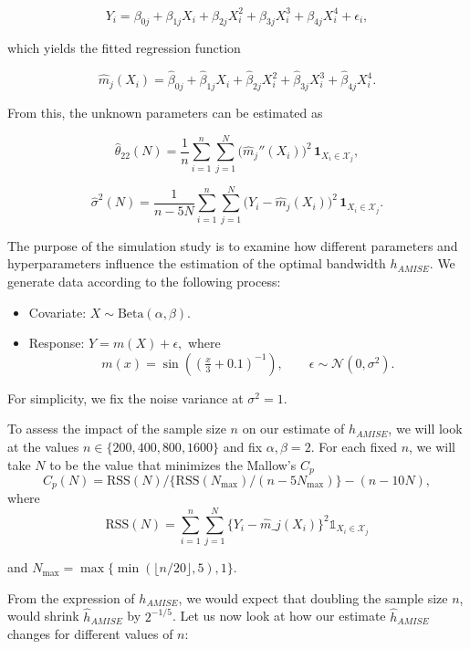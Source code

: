 \documentclass[
  letterpaper,
  DIV=11,
  numbers=noendperiod]{scrartcl}
\begin{document}
\[
Y_i = \beta_{0j} + \beta_{1j} X_i + \beta_{2j} X_i^2 + \beta_{3j} X_i^3 + \beta_{4j} X_i^4 + \epsilon_i,
\]

which yields the fitted regression function

\[
\hat{m}_j(X_i) = \hat{\beta}_{0j} + \hat{\beta}_{1j} X_i + \hat{\beta}_{2j} X_i^2 + \hat{\beta}_{3j} X_i^3 + \hat{\beta}_{4j} X_i^4.
\]

From this, the unknown parameters can be estimated as

\[
\hat{\theta}_{22}(N) = \frac{1}{n} \sum_{i=1}^n \sum_{j=1}^N \Big( \hat{m}_j''(X_i) \Big)^2 \, \mathbf{1}_{X_i \in \mathcal{X}_j},
\]

\[
\hat{\sigma}^2(N) = \frac{1}{n - 5N} \sum_{i=1}^n \sum_{j=1}^N \big( Y_i - \hat{m}_j(X_i) \big)^2 \, \mathbf{1}_{X_i \in \mathcal{X}_j}.
\]

The purpose of the simulation study is to examine how different
parameters and hyperparameters influence the estimation of the optimal
bandwidth \(h_{AMISE}\). We generate data according to the following
process:

\begin{itemize}
\item
  Covariate: \(X \sim \text{Beta}(\alpha, \beta).\)
\item
  Response: \(Y = m(X) + \epsilon,\) where \[
  m(x) = \sin\!\left( \left(\tfrac{x}{3} + 0.1\right)^{-1} \right),
  \qquad \epsilon \sim \mathcal{N}(0, \sigma^2).
  \]
\end{itemize}

For simplicity, we fix the noise variance at \(\sigma^2 = 1\).

To assess the impact of the sample size \(n\) on our estimate of
\(h_{AMISE}\), we will look at the values
\(n\in \{200, 400, 800, 1600\}\) and fix \(\alpha, \beta=2\). For each
fixed \(n\), we will take \(N\) to be the value that minimizes the
Mallow's \(C_p\)
\[ C_p(N)=\text{RSS}(N) / \lbrace \text{RSS} (N_{\max }) / (n-5 N_{\max })\rbrace -(n-10 N), \]
where
\[\text{RSS}(N) =  \sum_{i=1}^n \sum_{j=1}^N \lbrace Y_i - \hat{m}\_j(X_i) \rbrace^2 \mathbb{1}_{X_i \in \mathcal{X}_j}\]

and
\(N_{\max}= \max \lbrace \min (\lfloor n / 20\rfloor, 5 ), 1\rbrace\).

From the expression of \(h_{AMISE}\), we would expect that doubling the
sample size \(n\), would shrink \(\hat{h}_{AMISE}\) by \(2^{-1/5}\). Let
us now look at how our estimate \(\hat{h}_{AMISE}\) changes for
different values of \(n\):
\end{document}
